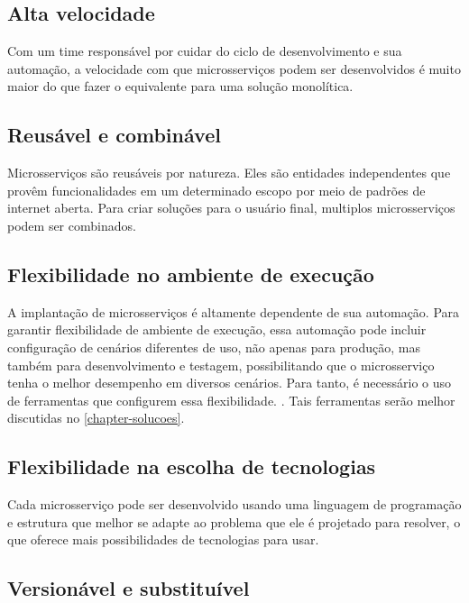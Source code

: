 \subsection{Alta velocidade}

Com um time responsável por cuidar do ciclo de desenvolvimento e sua automação, a velocidade com que microsserviços podem ser desenvolvidos é muito maior do que fazer o equivalente para uma solução monolítica. \cite{Familiar2015}

\subsection{Reusável e combinável}

Microsserviços são reusáveis por natureza. Eles são entidades independentes que provêm funcionalidades em um determinado escopo por meio de padrões de internet aberta. Para criar soluções para o usuário final, multiplos microsserviços podem ser combinados. \cite{Familiar2015}

\subsection{Flexibilidade no ambiente de execução}

A implantação de microsserviços é altamente dependente de sua automação. Para garantir flexibilidade de ambiente de execução, essa automação pode incluir configuração de cenários diferentes de uso, não apenas para produção, mas também para desenvolvimento e testagem, possibilitando que o microsserviço tenha o melhor desempenho em diversos cenários. Para tanto, é necessário o uso de ferramentas que configurem essa flexibilidade. \cite{Familiar2015}. Tais ferramentas serão melhor discutidas no \autoref{chapter-solucoes}.

\subsection{Flexibilidade na escolha de tecnologias}

Cada microsserviço pode ser desenvolvido usando uma linguagem de programação e estrutura que melhor se adapte ao problema que ele é projetado para resolver, o que oferece mais possibilidades de tecnologias para usar. \cite{oracle_microservices}

\subsection{Versionável e substituível}

